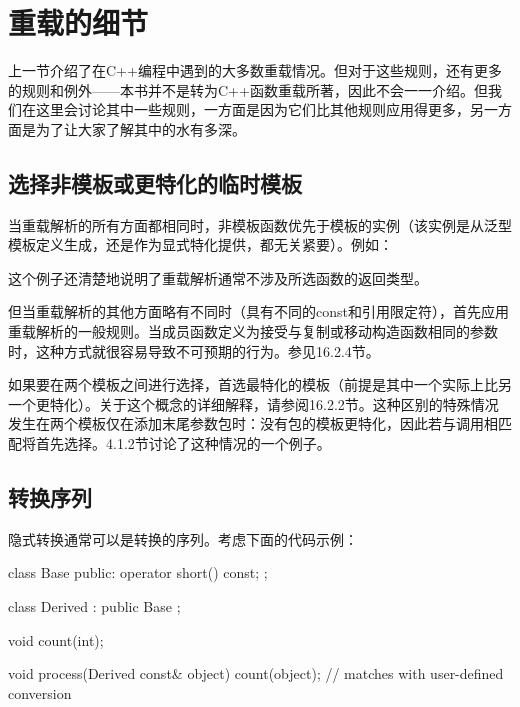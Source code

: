 \section{重载的细节}

上一节介绍了在C++编程中遇到的大多数重载情况。但对于这些规则，还有更多的规则和例外——本书并不是转为C++函数重载所著，因此不会一一介绍。但我们在这里会讨论其中一些规则，一方面是因为它们比其他规则应用得更多，另一方面是为了让大家了解其中的水有多深。

\subsection{选择非模板或更特化的临时模板}

当重载解析的所有方面都相同时，非模板函数优先于模板的实例（该实例是从泛型模板定义生成，还是作为显式特化提供，都无关紧要）。例如：


这个例子还清楚地说明了重载解析通常不涉及所选函数的返回类型。

但当重载解析的其他方面略有不同时（具有不同的const和引用限定符），首先应用重载解析的一般规则。当成员函数定义为接受与复制或移动构造函数相同的参数时，这种方式就很容易导致不可预期的行为。参见16.2.4节。

如果要在两个模板之间进行选择，首选最特化的模板（前提是其中一个实际上比另一个更特化）。关于这个概念的详细解释，请参阅16.2.2节。这种区别的特殊情况发生在两个模板仅在添加末尾参数包时：没有包的模板更特化，因此若与调用相匹配将首先选择。4.1.2节讨论了这种情况的一个例子。

\subsection{转换序列}

隐式转换通常可以是转换的序列。考虑下面的代码示例：

\begin{cpp}
class Base {
	public:
	operator short() const;
};

class Derived : public Base {};

void count(int);

void process(Derived const& object) {
	count(object); // matches with user-defined conversion
}
\end{cpp}

